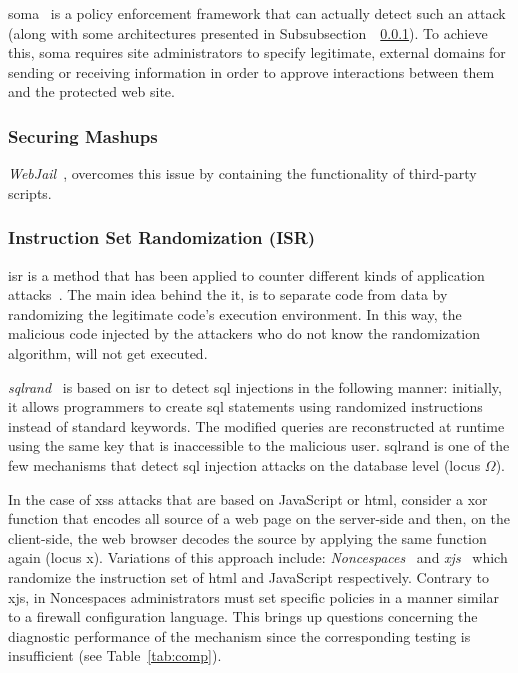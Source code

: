 \documentclass[conference]{IEEEtran}
\begin{document}
\noindent
{\sc soma}~\cite{OWVS08} is a policy enforcement framework that
can actually detect such an attack (along with some architectures
presented in Subsubsection~~\ref{sec:mashups}).
To achieve this, {\sc soma} requires site administrators
to specify legitimate, external domains for sending
or receiving information in order to approve interactions
between them and the protected web site.



\subsubsection{Securing Mashups}
\label{sec:mashups}

{\it WebJail}~\cite{VDDPJ11}, overcomes this issue
by containing the functionality of third-party scripts.

\subsubsection{Instruction Set Randomization (ISR)}

{\sc isr} is a method that has been applied to counter
different kinds of application attacks~\cite{K09b,KKP03}.
The main idea behind the it, is to
separate code from data by randomizing the legitimate code's 
execution environment. In this way, the malicious code
injected by the attackers who do not know the randomization
algorithm, will not get executed.

{\it {\sc sql}rand}~\cite{BK04} is based on {\sc isr}
to detect {\sc sql} injections in the following manner:
initially, it allows programmers to create {\sc sql} statements
using randomized instructions instead of standard keywords.
The modified queries are reconstructed at runtime using
the same key that is inaccessible to the malicious user.
{\sc sql}rand is one of the few mechanisms that
detect {\sc sql} injection attacks on the database
level (locus $\Omega$).

In the case of {\sc xss} attacks that are based on JavaScript
or {\sc html}, consider a {\sc xor} function that encodes all source of a web
page on the server-side and then, on the client-side, the web browser decodes the
source by applying the same function again (locus {\sc x}).
Variations of this approach include:
{\it Noncespaces}~\cite{GC09} and {\it x{\sc js}}~\cite{APKLM10}
which randomize the instruction set of {\sc html} and
JavaScript respectively.
Contrary to x{\sc js}, in Noncespaces administrators must set
specific policies in a manner similar to a firewall
configuration language. This brings up questions
concerning the diagnostic performance of the mechanism
since the corresponding testing is insufficient
(see Table~\ref{tab:comp}).
\end{document}
